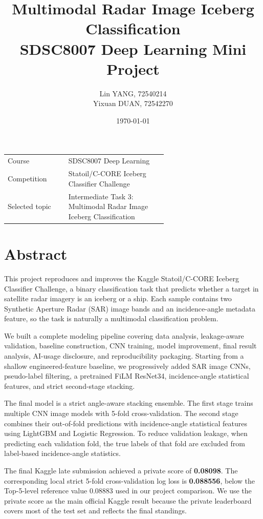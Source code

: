 \documentclass[11pt]{article}
\title{\textbf{Multimodal Radar Image Iceberg Classification}\\
\large SDSC8007 Deep Learning Mini Project}
\author{
Lin YANG, 72540214 \\
Yixuan DUAN, 72542270
}
\date{\today}
\begin{document}
\maketitle

\begin{center}
\begin{tabular}{lp{0.62\linewidth}}
\toprule
Course & SDSC8007 Deep Learning \\
Competition & Statoil/C-CORE Iceberg Classifier Challenge \\
Selected topic & Intermediate Task 3: Multimodal Radar Image Iceberg Classification \\
\bottomrule
\end{tabular}
\end{center}

\section*{Abstract}

This project reproduces and improves the Kaggle Statoil/C-CORE Iceberg Classifier Challenge, a binary classification task that predicts whether a target in satellite radar imagery is an iceberg or a ship. Each sample contains two Synthetic Aperture Radar (SAR) image bands and an incidence-angle metadata feature, so the task is naturally a multimodal classification problem.

We built a complete modeling pipeline covering data analysis, leakage-aware validation, baseline construction, CNN training, model improvement, final result analysis, AI-usage disclosure, and reproducibility packaging. Starting from a shallow engineered-feature baseline, we progressively added SAR image CNNs, pseudo-label filtering, a pretrained FiLM ResNet34, incidence-angle statistical features, and strict second-stage stacking.

The final model is a strict angle-aware stacking ensemble. The first stage trains multiple CNN image models with 5-fold cross-validation. The second stage combines their out-of-fold predictions with incidence-angle statistical features using LightGBM and Logistic Regression. To reduce validation leakage, when predicting each validation fold, the true labels of that fold are excluded from label-based incidence-angle statistics.

The final Kaggle late submission achieved a private score of \textbf{0.08098}. The corresponding local strict 5-fold cross-validation log loss is \textbf{0.088556}, below the Top-5-level reference value 0.08883 used in our project comparison. We use the private score as the main official Kaggle result because the private leaderboard covers most of the test set and reflects the final standings.
\end{document}
